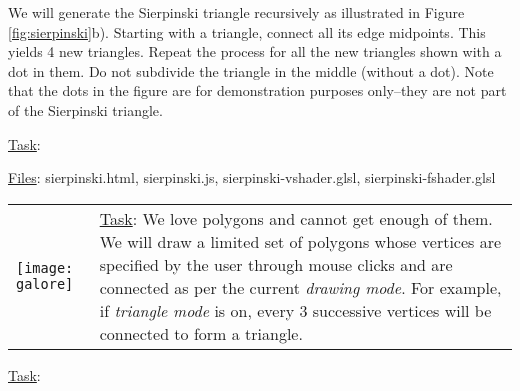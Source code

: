 \documentclass[addpoints]{exam}
\begin{document}
\begin{questions}
We will generate the Sierpinski triangle recursively as illustrated in Figure \ref{fig:sierpinski}b). Starting with a triangle, connect all its edge midpoints. This yields 4 new triangles. Repeat the process for all the new triangles shown with a dot in them. Do not subdivide the triangle in the middle (without a dot). Note that the dots in the figure are for demonstration purposes only--they are not part of the Sierpinski triangle.

\underline{Task}:
  \underline{Files}: sierpinski.html, sierpinski.js, sierpinski-vshader.glsl, sierpinski-fshader.glsl


  \label{q:galore}
  
  \begin{tabularx}{\linewidth}{lX}
    \texttt{[image: galore]}
    &
      \vspace{20pt} \underline{Task}: We love polygons and cannot get enough of them. We will draw a limited set of polygons whose vertices are specified by the user through mouse clicks and are connected as per the current \textit{drawing mode}. For example, if \textit{triangle mode} is on, every 3 successive vertices will be connected to form a triangle.
  \end{tabularx}

  \underline{Task}: 
\end{questions}
\end{document}
